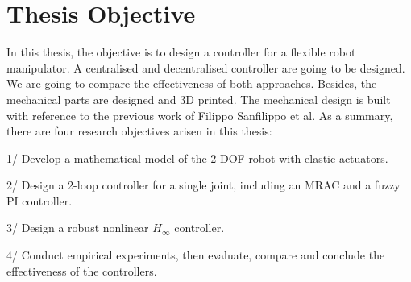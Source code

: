 \documentclass[\main/main.tex]{subfiles}
\begin{document}


\section{Thesis Objective}
In this thesis, the objective is to design a controller for a flexible robot manipulator. A centralised and decentralised controller are going to be designed. We are going to compare the effectiveness of both approaches. Besides, the mechanical parts are designed and 3D printed. The mechanical design is built with reference to the previous work of Filippo Sanfilippo et al. As a summary, there are four research objectives arisen in this thesis:\par
1/ Develop a mathematical model of the 2-DOF robot with elastic actuators.\par
2/ Design a 2-loop controller for a single joint, including an MRAC and a fuzzy PI controller.\par
3/ Design a robust nonlinear $H_\infty$ controller.\par
4/ Conduct empirical experiments, then evaluate, compare and conclude the effectiveness of the controllers.
\end{document}
